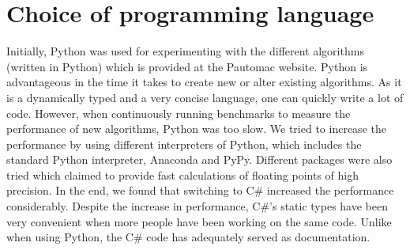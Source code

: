 \section{Choice of programming language}
Initially, Python was used for experimenting with the different algorithms (written in Python) which is provided at the Pautomac website.
Python is advantageous in the time it takes to create new or alter existing algorithms.
As it is a dynamically typed and a very concise language, one can quickly write a lot of code.
However, when continuously running benchmarks to measure the performance of new algorithms, Python was too slow.
We tried to increase the performance by using different interpreters of Python, which includes the standard Python interpreter, Anaconda and PyPy.
Different packages were also tried which claimed to provide fast calculations of floating points of high precision.
In the end, we found that switching to C\# increased the performance considerably.
Despite the increase in performance, C\#'s static types have been very convenient when more people have been working on the same code.
Unlike when using Python, the C\# code has adequately served as documentation.